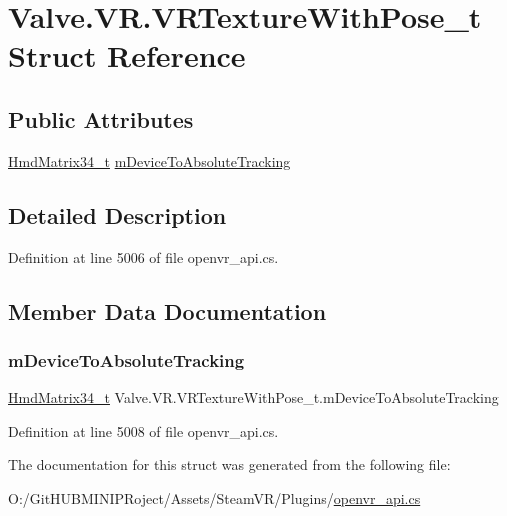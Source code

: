 \hypertarget{struct_valve_1_1_v_r_1_1_v_r_texture_with_pose__t}{}\section{Valve.\+V\+R.\+V\+R\+Texture\+With\+Pose\+\_\+t Struct Reference}
\label{struct_valve_1_1_v_r_1_1_v_r_texture_with_pose__t}
\subsection*{Public Attributes}
\begin{DoxyCompactItemize}
\item 
\mbox{\hyperlink{struct_valve_1_1_v_r_1_1_hmd_matrix34__t}{Hmd\+Matrix34\+\_\+t}} \mbox{\hyperlink{struct_valve_1_1_v_r_1_1_v_r_texture_with_pose__t_ae844b59637eba5d420e3916c30c26c52}{m\+Device\+To\+Absolute\+Tracking}}
\end{DoxyCompactItemize}


\subsection{Detailed Description}


Definition at line 5006 of file openvr\+\_\+api.\+cs.



\subsection{Member Data Documentation}
\mbox{\label{struct_valve_1_1_v_r_1_1_v_r_texture_with_pose__t_ae844b59637eba5d420e3916c30c26c52}} 
\subsubsection{\texorpdfstring{mDeviceToAbsoluteTracking}{mDeviceToAbsoluteTracking}}
{\footnotesize\ttfamily \mbox{\hyperlink{struct_valve_1_1_v_r_1_1_hmd_matrix34__t}{Hmd\+Matrix34\+\_\+t}} Valve.\+V\+R.\+V\+R\+Texture\+With\+Pose\+\_\+t.\+m\+Device\+To\+Absolute\+Tracking}



Definition at line 5008 of file openvr\+\_\+api.\+cs.



The documentation for this struct was generated from the following file\+:\begin{DoxyCompactItemize}
\item 
O\+:/\+Git\+H\+U\+B\+M\+I\+N\+I\+P\+Roject/\+Assets/\+Steam\+V\+R/\+Plugins/\mbox{\hyperlink{openvr__api_8cs}{openvr\+\_\+api.\+cs}}\end{DoxyCompactItemize}
